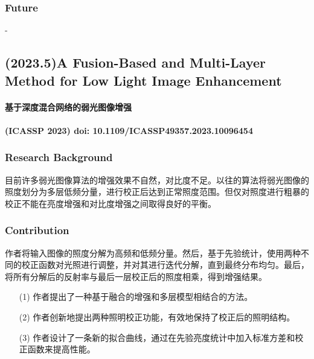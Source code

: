 \documentclass[a4paper]{ctexart}
\begin{document}
	\subsubsection{Future}
	
	-
	
	\subsection{(2023.5)A Fusion-Based and Multi-Layer Method for Low Light Image Enhancement}
	
	\paragraph{基于深度混合网络的弱光图像增强}
	
	\paragraph{(ICASSP 2023) doi: 10.1109/ICASSP49357.2023.10096454}
	
	\subsubsection{Research Background}
	
	目前许多弱光图像算法的增强效果不自然，对比度不足。以往的算法将弱光图像的照度划分为多层低频分量，进行校正后达到正常照度范围。但仅对照度进行粗暴的校正不能在亮度增强和对比度增强之间取得良好的平衡。
	
	\subsubsection{Contribution}
	
	作者将输入图像的照度分解为高频和低频分量。然后，基于先验统计，使用两种不同的校正函数对光照进行调整，并对其进行迭代分解，直到最终分布均匀。最后，将所有分解后的反射率与最后一层校正后的照度相乘，得到增强结果。
	
	\begin{itemize}
		\item[(1)] 
		作者提出了一种基于融合的增强和多层模型相结合的方法。
		
		\item[(2)]
		作者创新地提出两种照明校正功能，有效地保持了校正后的照明结构。
		
		\item[(3)]
		作者设计了一条新的拟合曲线，通过在先验亮度统计中加入标准方差和校正函数来提高性能。
	\end{itemize}	
	
\end{document}

